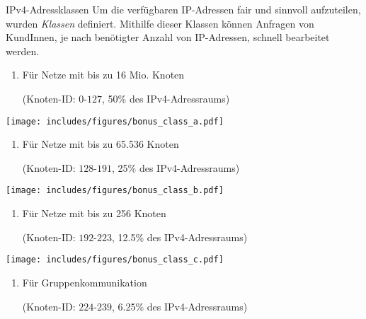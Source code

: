 \begin{defi}{IPv4-Adressklassen}
    Um die verfügbaren IP-Adressen fair und sinnvoll aufzuteilen, wurden \emph{Klassen} definiert.
    Mithilfe dieser Klassen können Anfragen von KundInnen, je nach benötigter Anzahl von IP-Adressen, schnell bearbeitet werden.
    
    \begin{enumerate}[label=Klasse \Alph*:, leftmargin=*]
        \item Für Netze mit bis zu 16 Mio. Knoten
              
              (Knoten-ID: $0\text{-}127$, 50\% des IPv4-Adressraums)
    \end{enumerate}
    
    \begin{center}
        \texttt{[image: includes/figures/bonus\_class\_a.pdf]}
    \end{center}
    
    \begin{enumerate}[label=Klasse \Alph*:, leftmargin=*, start=2]
        \item Für Netze mit bis zu 65.536 Knoten
              
              (Knoten-ID: $128\text{-}191$, 25\% des IPv4-Adressraums)
    \end{enumerate}
    
    \begin{center}
        \texttt{[image: includes/figures/bonus\_class\_b.pdf]}
    \end{center}
    
    \begin{enumerate}[label=Klasse \Alph*:, leftmargin=*, start=3]
        \item Für Netze mit bis zu 256 Knoten
              
              (Knoten-ID: $192\text{-}223$, 12.5\% des IPv4-Adressraums)
    \end{enumerate}
    
    \begin{center}
        \texttt{[image: includes/figures/bonus\_class\_c.pdf]}
    \end{center}
    
    \begin{enumerate}[label=Klasse \Alph*:, leftmargin=*, start=4]
        \item Für Gruppenkommunikation
              
              (Knoten-ID: $224\text{-}239$, 6.25\% des IPv4-Adressraums)
    \end{enumerate}
    

\end{defi}

